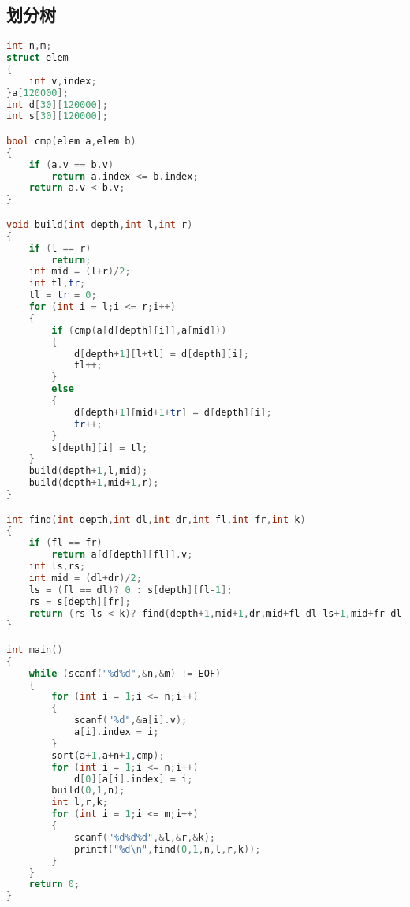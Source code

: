 \subsection{划分树}
	\begin{lstlisting}[language=c++]
int n,m;
struct elem
{
	int v,index;
}a[120000];
int d[30][120000];
int s[30][120000];

bool cmp(elem a,elem b)
{
	if (a.v == b.v)
		return a.index <= b.index;
	return a.v < b.v;
}

void build(int depth,int l,int r)
{
	if (l == r)
		return;
	int mid = (l+r)/2;
	int tl,tr;
	tl = tr = 0;
	for (int i = l;i <= r;i++)
	{
		if (cmp(a[d[depth][i]],a[mid]))
		{
			d[depth+1][l+tl] = d[depth][i];
			tl++;
		}
		else
		{
			d[depth+1][mid+1+tr] = d[depth][i];
			tr++;
		}
		s[depth][i] = tl;
	}
	build(depth+1,l,mid);
	build(depth+1,mid+1,r);
}

int find(int depth,int dl,int dr,int fl,int fr,int k)
{
	if (fl == fr)
		return a[d[depth][fl]].v;
	int ls,rs;
	int mid = (dl+dr)/2;
	ls = (fl == dl)? 0 : s[depth][fl-1];
	rs = s[depth][fr];
	return (rs-ls < k)? find(depth+1,mid+1,dr,mid+fl-dl-ls+1,mid+fr-dl-rs+1,k-(rs-ls)) : find(depth+1,dl,mid,dl+ls,dl+rs-1,k);
}

int main()
{
	while (scanf("%d%d",&n,&m) != EOF)
	{
		for (int i = 1;i <= n;i++)
		{
			scanf("%d",&a[i].v);
			a[i].index = i;
		}
		sort(a+1,a+n+1,cmp);
		for (int i = 1;i <= n;i++)
			d[0][a[i].index] = i;
		build(0,1,n);
		int l,r,k;
		for (int i = 1;i <= m;i++)
		{
			scanf("%d%d%d",&l,&r,&k);
			printf("%d\n",find(0,1,n,l,r,k));
		}
	}
	return 0;
}
	\end{lstlisting}
